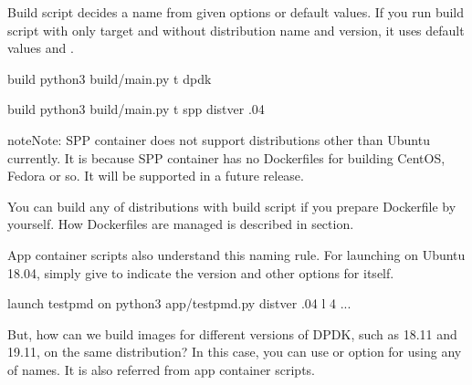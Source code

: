 \documentclass[a4paper,11pt,openany,oneside,english]{sphinxmanual}
\begin{document}
Build script decides a name from given options or default values.
If you run build script with only target and without distribution
name and version, it uses default values  and .

\begin{sphinxVerbatim}[commandchars=\\\{\},formatcom=\footnotesize]
 build 
 python3 build/main.py \PYGZhy{}t dpdk

 build 
 python3 build/main.py \PYGZhy{}t spp \PYGZhy{}\PYGZhy{}dist\PYGZhy{}ver .04
\end{sphinxVerbatim}

\begin{sphinxadmonition}{note}{Note:}
SPP container does not support distributions other than Ubuntu
currently.
It is because SPP container has no Dockerfiles for building
CentOS, Fedora or so. It will be supported in a future release.

You can build any of distributions with build script
if you prepare Dockerfile by yourself.
How Dockerfiles are managed is described in
{\hyperref[\detokenize{tools/sppc/build_img:sppc-build-img-dockerfiles}]{}} section.
\end{sphinxadmonition}

App container scripts also understand this naming rule.
For launching  on Ubuntu 18.04,
simply give  to indicate the version and other options
for  itself.

\begin{sphinxVerbatim}[commandchars=\\\{\},formatcom=\footnotesize]
 launch testpmd on 
 python3 app/testpmd.py \PYGZhy{}\PYGZhy{}dist\PYGZhy{}ver .04 \PYGZhy{}l \PYGZhy{}4 ...
\end{sphinxVerbatim}

But, how can we build images for different versions of DPDK,
such as 18.11 and 19.11, on the same distribution?
In this case, you can use  or  option for
using any of names. It is also referred from app container scripts.
\end{document}
